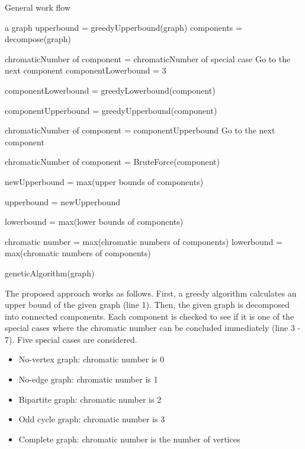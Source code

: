 \documentclass[a4paper]{report}
\begin{document}
	\begin{algorithm}
		\caption{General work flow}
		\label{alg:overview}
		\begin{algorithmic}[1]
			\REQUIRE a graph
			\STATE upperbound = greedyUpperbound(graph)
			\STATE components = decompose(graph)
				
					\STATE chromaticNumber of component = chromaticNumber of special case
					\STATE Go to the next component
				\ELSE 
					\STATE componentLowerbound = 3
				\ENDIF
				
				\STATE componentLowerbound = greedyLowerbound(component)
				\ENDIF
				
				\STATE componentUpperbound =  greedyUpperbound(component)

				\STATE chromaticNumber of component = componentUpperbound
				\STATE Go to the next component
				\ENDIF
				
				\STATE chromaticNumber of component = BruteForce(component)
				\ENDIF 
			\ENDFOR

			\STATE newUpperbound = max(upper bounds of components)
			
			\STATE upperbound = newUpperbound 
			\ENDIF
			
			\STATE lowerbound = max(lower bounds of components)
			
			\STATE chromatic number = max(chromatic numbers of components)
			\ELSE
			\STATE lowerbound = max(chromatic numbers of components)
			\ENDIF
			
			\STATE geneticAlgorithm(graph)
		\end{algorithmic}
	\end{algorithm}
	The proposed approach works as follows. First, a greedy algorithm calculates an upper bound of the given graph (line 1). Then, the given graph is decomposed into connected components. Each component is checked to see if it is one of the special cases where the chromatic number can be concluded immediately (line 3 - 7). Five special cases are considered.
	\begin{itemize}
		\item No-vertex graph: chromatic number is 0
		\item No-edge graph: chromatic number is 1
		\item Bipartite graph: chromatic number is 2
		\item Odd cycle graph: chromatic number is 3
		\item Complete graph: chromatic number is the number of vertices
	\end{itemize}
\end{document}
